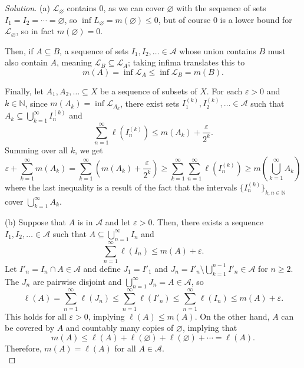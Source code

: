 \documentclass[10pt]{article}
\providecommand{\eps}{\varepsilon}
\providecommand{\NN}{\mathbb N}
\newenvironment{soln}{\begin{proof}[Solution]}{\end{proof}}
\begin{document}
\begin{soln}
    (a) $\mathcal L_{\varnothing}$ contains $0$, as we can cover $\varnothing$
    with the sequence of sets $I_1=I_2=\cdots=\varnothing$,
    so $\inf L_\varnothing = m(\varnothing) \le 0$,
    but of course $0$ is a lower bound for $\mathcal L_\varnothing$,
    so in fact $m(\varnothing) = 0$.

    Then, if $A\subseteq B$, a sequence of sets $I_1,I_2,\ldots\in\mathcal A$
    whose union contains $B$ must also contain $A$, meaning
    $\mathcal L_B\subseteq\mathcal L_A$; taking infima translates this to
    \begin{equation*}
	m(A) = \inf\mathcal L_A\le \inf\mathcal L_B = m(B).
    \end{equation*}

    Finally, let $A_1,A_2,\ldots\subseteq X$ be a sequence of subsets of $X$.
    For each $\eps > 0$ and $k\in\NN$, since $m(A_k) = \inf\mathcal L_{A_k}$,
    there exist sets $I^{(k)}_1,I^{(k)}_2,\ldots\in\mathcal A$
    such that $A_k\subseteq\bigcup_{k=1}^\infty I^{(k)}_n$ and
    \begin{equation*}
	\sum_{n=1}^\infty \ell(I^{(k)}_n)\le m(A_k) + \frac\eps{2^k}.
    \end{equation*}
    Summing over all $k$, we get
    \begin{equation*}
	\eps+\sum_{k=1}^\infty m(A_k) =
	\sum_{k=1}^\infty \left(m(A_k) + \frac\eps{2^k}\right)
	\ge \sum_{k=1}^\infty \sum_{n=1}^\infty \ell(I^{(k)}_n)
	\ge m\left(\bigcup_{k=1}^\infty A_k\right)
    \end{equation*}
    where the last inequality is a result of the fact that
    the intervals $\{I^{(k)}_n\}_{k,n\in\NN}$ cover $\bigcup_{k=1}^\infty A_k$.

    (b) Suppose that $A$ is in $\mathcal A$ and let $\eps>0$.
    Then, there exists a sequence $I_1,I_2,\ldots\in\mathcal A$
    such that $A\subseteq \bigcup_{n=1}^\infty I_n$ and
    \begin{equation*}
	\sum_{n=1}^\infty \ell(I_n) \le m(A) + \eps.
    \end{equation*}
    Let $I'_n = I_n\cap A\in\mathcal A$ and define $J_1 = I'_1$
    and $J_n = I'_n\setminus\bigcup_{k=1}^{n-1}I'_n\in\mathcal A$ for $n\ge 2$.
    The $J_n$ are pairwise disjoint and
    $\bigcup_{n=1}^\infty J_n = A\in\mathcal A$, so
    \begin{equation*}
	\ell(A) = \sum_{n=1}^\infty \ell(J_n)
	\le \sum_{n=1}^\infty \ell(I'_n)
	\le \sum_{n=1}^\infty \ell(I_n)
	\le m(A) + \eps.
    \end{equation*}
    This holds for all $\eps>0$, implying $\ell(A) \le m(A)$.
    On the other hand, $A$ can be covered by
    $A$ and countably many copies of $\varnothing$, implying that
    \begin{equation*}
        m(A) \le \ell(A) + \ell(\varnothing) + \ell(\varnothing) + \cdots
	= \ell(A).
    \end{equation*}
    Therefore, $m(A) = \ell(A)$ for all $A\in\mathcal A$.
    \\


\end{soln}
\end{document}
